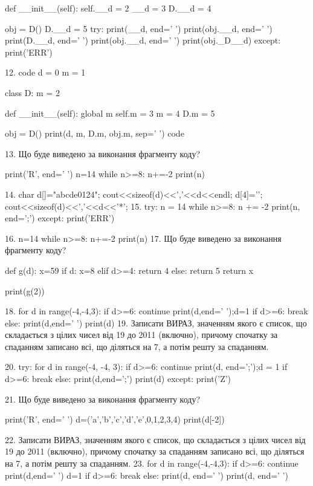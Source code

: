 \documentclass[11pt]{article}
\begin{document}
    def __init__(self):
        self.__d = 2
        __d = 3
        D.__d = 4

obj = D()
D.__d = 5
try:
    print(__d, end=' ')
    print(obj.__d, end=' ')
    print(D.__d, end=' ')
    print(obj.__d, end=' ')
    print(obj._D__d)
except:
    print('ERR')

12. 
code
d = 0
m = 1

class D:
    m = 2
    
    def __init__(self):
global m        self.m = 3
        m = 4
        D.m = 5

obj = D()
print(d, m, D.m, obj.m, sep=' ')
code

13. Що буде виведено за виконання фрагменту коду?

print('R', end=' ')
n=14
while n>=8:
    n+=-2
print(n)


14. 
char d[]="abcde0124"; cout<<sizeof(d)<<','<<d<<endl;
   d[4]='\0'; cout<<sizeof(d)<<','<<d<<'*';
15. 
try:
    n = 14
    while n>=8:
        n += -2
    print(n, end=';')
except:
    print('ERR')

16. 
n=14
   while n>=8: n+=-2
   print(n)
17. Що буде виведено за виконання фрагменту коду?

def g(d):
    x=59
    if d: 
        x=8
    elif d>=4:
         return 4
    else:
         return 5
    return x

print(g(2))

18. 
for d in range(-4,-4,3):
     if d>=6: continue
     print(d,end=' ');d=1
     if d>=6: break
   else: print(d,end=' ')
   print(d)
19. 
Записати ВИРАЗ, значенням якого є список, що складається з цілих чисел від 19 до 2011 (включно), причому спочатку за спаданням записано всі, що діляться на 7, а потім решту за спаданням.

20. 
try:
    for d in range(-4, -4, 3):
        if d>=6:
            continue
        print(d, end=';');d = 1
        if d>=6:
            break
    else:
        print(d,end=';')
    print(d)
except:
    print('Z')

21. Що буде виведено за виконання фрагменту коду?

print('R', end=' ')
d=('a','b','c','d','e',0,1,2,3,4)
print(d[-2])


22. 
Записати ВИРАЗ, значенням якого є список, що складається з цілих чисел від 19 до 2011 (включно), причому спочатку за спаданням записано всі, що діляться на 7, а потім решту за спаданням.
23. 
for d in range(-4,-4,3):
    if d>=6:
        continue
        print(d,end=' ')
        d=1
    if d>=6:
        break
else:
    print(d, end=' ')
print(d, end=' ')
\end{document}
